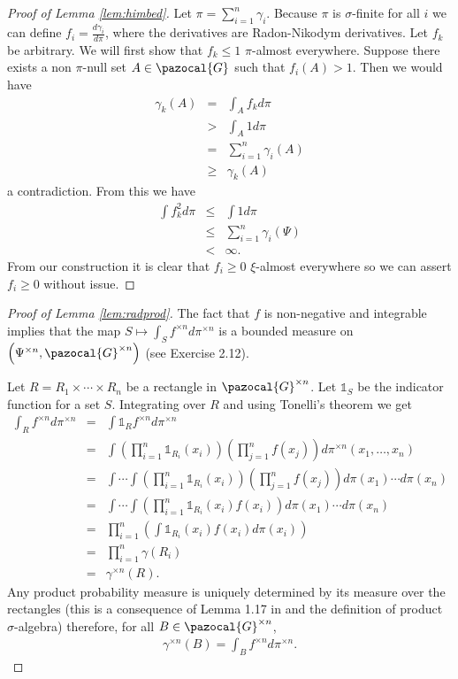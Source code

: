 \documentclass[aos,preprint]{imsart}
\def\l{\left}
\def\r{\right}
\def\sG{\pazocal{G}}
\theoremstyle{plain}
\theoremstyle{defintion}
\begin{document}
	\begin{proof}[Proof of Lemma \ref{lem:himbed}]
		Let $\pi= \sum_{i=1}^n \gamma_i$. Because $\pi$ is $\sigma$-finite for all $i$ we can define $f_i = \frac{d\gamma_i}{d\pi}$, where the derivatives are Radon-Nikodym derivatives. Let $f_k$ be arbitrary. We will first show that $f_k\le1$ $\pi$-almost everywhere. Suppose there exists a non $\pi$-null set $A \in \sG$ such that $f_i(A) >1$. Then we would have
		\begin{eqnarray*}
			\gamma_k\left( A \right)
			&=& \int_A f_k d\pi	\\
		 &>& \int_A 1 d\pi\\
		 &=& \sum_{i=1}^n \gamma_i(A)\\
		 &\ge& \gamma_k(A)
		\end{eqnarray*}
		a contradiction. From this we have
		\begin{eqnarray*}
			\int f_k^2 d\pi
			&\le& \int 1 d\pi\\
		 &\le& \sum_{i=1}^n \gamma_i(\Psi)\\
		 &<& \infty.
		\end{eqnarray*}
		From our construction it is clear that $f_i \ge 0$ $\xi$-almost everywhere so we can assert $f_i \ge 0$ without issue.
	\end{proof}

	\begin{proof}[Proof of Lemma \ref{lem:radprod}]
		The fact that $f$ is non-negative and integrable implies that the map $S \mapsto \int_S f^{\times n}d\pi^{\times n}$ is a bounded measure on $\l(\Psi^{\times n}, \sG^{\times n}\r)$ (see \cite{folland99} Exercise 2.12). 

		Let $R= R_1 \times\cdots\times R_n$ be a rectangle in $\sG^{\times n}$. Let $\mathds{1}_S$ be the indicator function for a set $S$. Integrating over $R$ and using Tonelli's theorem we get
		\begin{eqnarray*}
			\int_R f^{\times n} d \pi^{\times n}
			&=& \int \mathds{1}_Rf^{\times n}d \pi^{\times n}\\
		 &=& \int \l(\prod_{i=1}^n \mathds{1}_{R_i}(x_i)\r)\l(\prod_{j=1}^n f(x_j)\r)d \pi^{\times n}\left( x_1,\ldots,x_n \right)\\
		 &=& \int\cdots\int \l(\prod_{i=1}^n \mathds{1}_{R_i}(x_i)\r)\l(\prod_{j=1}^n f(x_j)\r)d \pi(x_1)\cdots d\pi(x_n)\\
		 &=& \int\cdots\int \l(\prod_{i=1}^n \mathds{1}_{R_i}(x_i) f(x_i)\r)d \pi(x_1)\cdots d\pi(x_n)\\
		 &=&  \prod_{i=1}^n\l(\int \mathds{1}_{R_i}(x_i) f(x_i)d \pi(x_i)\r)\\
		 &=&  \prod_{i=1}^n\gamma(R_i)\\
		 &=&  \gamma^{\times n}(R).
		\end{eqnarray*}
		Any product probability measure is uniquely determined by its measure over the rectangles (this is a consequence of Lemma 1.17 in \cite{fomp} and the definition of product $\sigma$-algebra) therefore, for all $B\in \sG^{\times n}$,
		\begin{eqnarray*}
			\gamma^{\times n}\left( B \right) = \int_B f^{\times n} d\pi^{\times n}.
		\end{eqnarray*}
	\end{proof}
\end{document}
